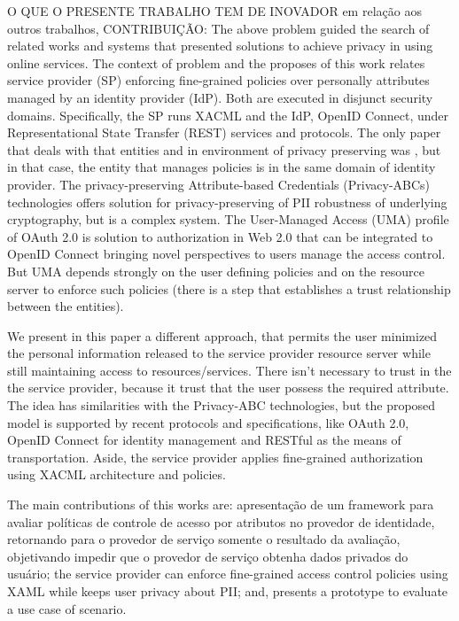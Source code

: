 \documentclass{doublecol-new}
\begin{document}
O QUE O PRESENTE TRABALHO TEM DE INOVADOR em relação aos outros trabalhos, CONTRIBUIÇÃO:
The above problem guided the search of related works and systems that presented solutions to achieve privacy in using online services. The context of problem and the proposes of this work relates service provider (SP) enforcing fine-grained policies over personally attributes managed by an identity provider (IdP). Both are executed in disjunct security domains. Specifically, the SP runs XACML and the IdP, OpenID Connect, under Representational State Transfer (REST) services and protocols. The only paper that deals with that entities and in environment of privacy preserving was \citep{ma2015cloud}, but in that case, the entity that manages policies is in the same domain of identity provider. The privacy-preserving Attribute-based Credentials (Privacy-ABCs) technologies \cite{camenisch2009credential,dagdee2011extending} offers solution for privacy-preserving of PII robustness of underlying cryptography, but is a complex system. The User-Managed Access (UMA) profile of OAuth 2.0 \cite{hardjono-oauth-umacore-14} is solution to authorization in Web 2.0 that can be integrated to OpenID Connect bringing novel perspectives to users manage the access control. But UMA depends strongly on the user defining policies and on the resource server to enforce such policies (there is a step that establishes a trust relationship between the entities). 

We present in this paper a different approach, that permits the user minimized the personal information released to the service provider resource server while still maintaining access to resources/services. There isn't necessary to trust in the the service provider, because it trust that the user possess the required attribute. The idea has similarities with the Privacy-ABC technologies, but the proposed model is supported by recent protocols and specifications, like OAuth 2.0, OpenID Connect for identity management and RESTful as the means of transportation. Aside, the service provider applies fine-grained authorization using XACML architecture and policies.

The main contributions of this works are: apresentação de um framework para avaliar políticas de controle de acesso por atributos no provedor de identidade, retornando para o provedor de serviço somente o resultado da avaliação, objetivando impedir que o provedor de serviço obtenha dados privados do usuário; the service provider can enforce fine-grained access control policies using XAML while keeps user privacy about PII; and, presents a prototype to evaluate a use case of scenario.
\end{document}
